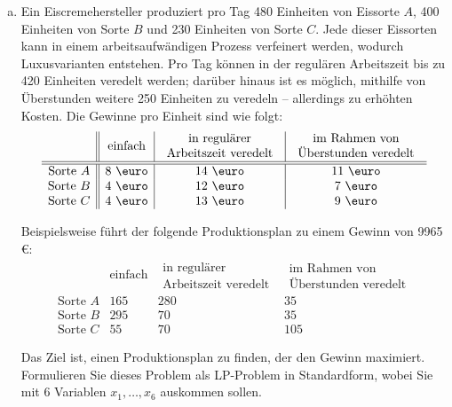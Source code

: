 \documentclass[10pt, a4paper]{article}
\begin{document}
\begin{enumerate}[\bfseries A:]
\begin{enumerate}[\bfseries 1.]
\begin{enumerate}[a)]
	\item Ein Eiscremehersteller produziert pro Tag 480 Einheiten von Eissorte $A$, 400 Einheiten von Sorte $B$ und 230 Einheiten von Sorte $C$. Jede dieser Eissorten kann in einem arbeitsaufwändigen Prozess verfeinert werden, wodurch Luxusvarianten entstehen. Pro Tag können in der regulären Arbeitszeit bis zu 420 Einheiten veredelt werden; darüber hinaus ist es möglich, mithilfe von Überstunden weitere 250 Einheiten zu veredeln -- allerdings zu erhöhten Kosten. Die Gewinne pro Einheit sind wie folgt:
	\[
	\begin{array}{c||c|c|c}
	& \text{einfach} 
	& \begin{array}{c} \text{in regulärer} \\ \text{Arbeitszeit veredelt} \end{array} 
	& \begin{array}{c} \text{im Rahmen von} \\ \text{Überstunden veredelt} \end{array} \\[1mm] \hline\hline
	\text{Sorte } A & 8$ \euro$ & 14$ \euro$ & 11$ \euro$ \\
	\text{Sorte } B & 4$ \euro$ & 12$ \euro$ &  7$ \euro$ \\
	\text{Sorte } C & 4$ \euro$ & 13$ \euro$ &  9$ \euro$ 
	\end{array}
	\]
	
	Beispielsweise führt der folgende Produktionsplan zu einem Gewinn von 9965 $\euro$:
	\[
	\begin{array}{c||c|c|c}
	& \text{einfach} 
	& \begin{array}{c} \text{in regulärer} \\ \text{Arbeitszeit veredelt} \end{array} 
	& \begin{array}{c} \text{im Rahmen von} \\ \text{Überstunden veredelt} \end{array} \\[1mm] \hline\hline
	\text{Sorte } A & 165 & 280 &  35 \\[1mm]
	\text{Sorte } B & 295 &  70 &  35 \\[1mm]
	\text{Sorte } C &  55 &  70 &  105
	\end{array}
	\]
	
	Das Ziel ist, einen Produktionsplan zu finden, der den Gewinn maximiert. Formulieren Sie dieses Problem als LP-Problem in Standardform, wobei Sie mit 6 Variablen $x_1,\ldots,x_6$ auskommen sollen.
	
\end{enumerate}


\end{enumerate}
\end{enumerate}
\end{document}
